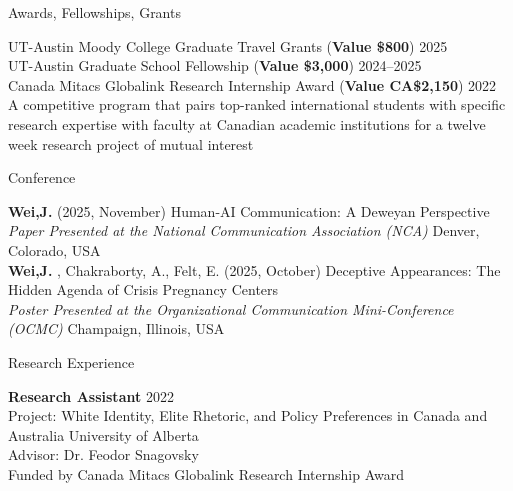 \documentclass[
	11pt, %
]{resume} %
\begin{document}
\begin{rSection}{Awards, Fellowships, Grants}
	
	UT-Austin Moody College Graduate Travel Grants (\textbf{Value \$800})  \hfill 2025\\
	UT-Austin Graduate School Fellowship   (\textbf{Value \$3,000})  \hfill 2024--2025\\
    Canada Mitacs Globalink Research Internship Award     (\textbf{Value CA\$2,150})  \hfill 2022\\
\textbullet\enspace  A competitive program that pairs top-ranked international students with specific research expertise with faculty at Canadian academic institutions for a twelve week research project of mutual interest\\
	
\end{rSection}


\begin{rSection}{Conference}
	
	\textbf{Wei,J.} (2025, November) Human-AI Communication: A Deweyan Perspective\\
	\textit{Paper Presented at the National Communication Association (NCA)} \hfill Denver, Colorado, USA \\

	\textbf{Wei,J.} , Chakraborty, A., Felt, E. (2025, October) Deceptive Appearances: The Hidden Agenda of Crisis Pregnancy Centers \\
	\textit{Poster Presented at the Organizational Communication Mini-Conference (OCMC)} \hfill Champaign, Illinois, USA \\
	
\end{rSection}


\begin{rSection}{Research Experience}
	
	\textbf{Research Assistant} \hfill 2022\\
    {Project:} White Identity, Elite Rhetoric, and Policy Preferences in Canada and Australia \hfill University of Alberta \\
    {Advisor:} Dr. Feodor Snagovsky \\
\textbullet\enspace Funded by Canada Mitacs Globalink Research Internship Award\\

	
\end{rSection}
\end{document}

